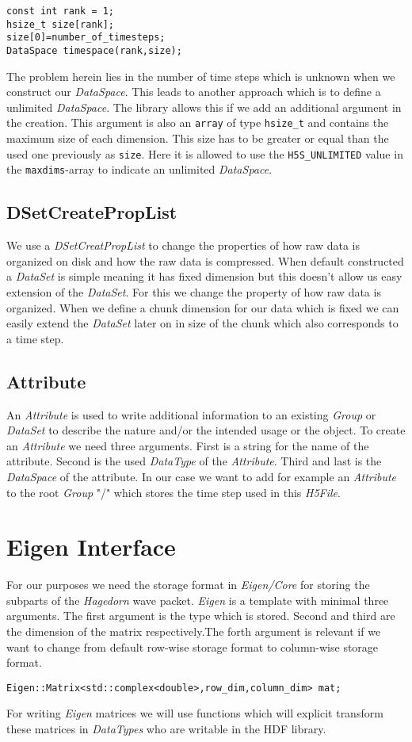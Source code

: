 \documentclass{article}
\begin{document}
\begin{lstlisting}
const int rank = 1;
hsize_t size[rank];
size[0]=number_of_timesteps;
DataSpace timespace(rank,size);
\end{lstlisting}
The problem herein lies in the number of time steps which is unknown when we construct our \textit{DataSpace}. This leads to another approach which is to define a unlimited \textit{DataSpace}. The library allows this if we add an additional argument in the creation. This argument is also an \texttt{array} of type \texttt{hsize\_t} and contains the maximum size of each dimension. This size has to be greater or equal than the used one previously as \texttt{size}. Here it is allowed to use the \texttt{H5S\_UNLIMITED} value in the \texttt{maxdims}-array to indicate an unlimited \textit{DataSpace}.

\subsection{DSetCreatePropList}
We use a \textit{DSetCreatPropList} to change the properties of how raw data is organized on disk and how the raw data is compressed. When default constructed a \textit{DataSet} is simple meaning it has fixed dimension but this doesn't allow us easy extension of the \textit{DataSet}. For this we change the property of how raw data is organized. When we define a chunk dimension for our data which is fixed we can easily extend the \textit{DataSet} later on in size of the chunk which also corresponds to a time step.
\subsection{Attribute}
An \textit{Attribute} is used to write additional information to an existing \textit{Group} or \textit{DataSet} to describe the nature and/or the intended usage or the object. To create an \textit{Attribute} we need three arguments. First is a string for the name of the attribute. Second is the used \textit{DataType} of the \textit{Attribute}. Third and last is the \textit{DataSpace} of the attribute. In our case we want to add for example an \textit{Attribute} to the root \textit{Group} "/" which stores the time step used in this \textit{H5File}.



\section{Eigen Interface}
For our purposes we need the storage format in \textit{Eigen/Core} for storing the subparts of the \textit{Hagedorn} wave packet. \textit{Eigen} is a template with minimal three arguments. The first argument is the type which is stored. Second and third are the dimension of the matrix respectively.The forth argument is relevant if we want to change from default row-wise storage format to column-wise storage format.
\begin{lstlisting}
Eigen::Matrix<std::complex<double>,row_dim,column_dim> mat;
\end{lstlisting}
For writing \textit{Eigen} matrices we will use functions which will explicit transform these matrices in \textit{DataTypes} who are writable in the HDF library.
\end{document}
